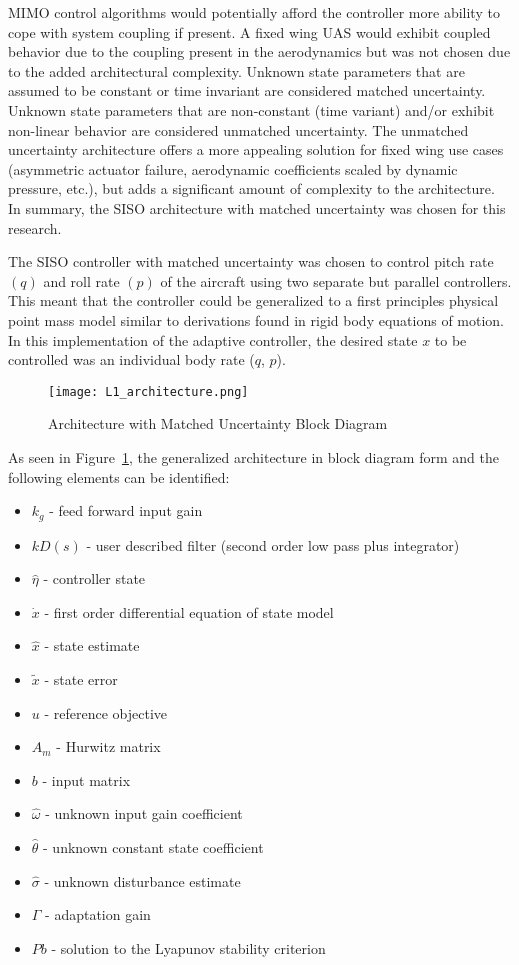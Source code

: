 \ac{MIMO} control algorithms would potentially afford the controller more ability to cope with system coupling if present.  A fixed wing \ac{UAS} would exhibit coupled behavior due to the coupling present in the aerodynamics but was not chosen due to the added architectural complexity.  Unknown state parameters that are assumed to be constant or time invariant are considered matched uncertainty.  Unknown state parameters that are non-constant (time variant) and/or exhibit non-linear behavior are considered unmatched uncertainty.  The unmatched uncertainty architecture offers a more appealing solution for fixed wing use cases (asymmetric actuator failure, aerodynamic coefficients scaled by dynamic pressure, etc.), but adds a significant amount of complexity to the architecture.  In summary, the \ac{SISO} architecture with matched uncertainty was chosen for this research.  

The \ac{SISO} controller with matched uncertainty was chosen to control pitch rate $(q)$ and roll rate $(p)$ of the aircraft using two separate but parallel controllers.  This meant that the controller could be generalized to a first principles physical point mass model similar to derivations found in rigid body equations of motion.  In this implementation of the \Lone adaptive controller, the desired state $x$ to be controlled was an individual body rate (\eg $q$, $p$). 

\begin{figure}[h!]
 \centering
  \texttt{[image: L1\_architecture.png]}
  \caption{\Lone Architecture with Matched Uncertainty Block Diagram \cite{hovakimyan2010l1} }
  \label{fig:l1_architecture}
\end{figure}

As seen in Figure~\ref{fig:l1_architecture}, the generalized \Lone architecture in block diagram form and the following elements can be identified:
\begin{itemize}
	\item[] $k_g$ - feed forward input gain
	\item[] $kD(s)$ - user described filter (second order low pass plus integrator)
	\item[] $\hat{\eta}$ - \Lone controller state
	\item[] $\dot{x}$ - first order differential equation of state model
	\item[] $\hat{x}$ - state estimate
	\item[] $\tilde{x}$ - state error
	\item[] $u$ - reference objective
	\item[] $A_m$ - Hurwitz matrix
	\item[] $b$ - input matrix
	\item[] $\hat{\omega}$ - unknown input gain coefficient
	\item[] $\hat{\theta}$ - unknown constant state coefficient
	\item[] $\hat{\sigma}$ - unknown disturbance estimate
	\item[] $\Gamma$ - adaptation gain
	\item[] $Pb$ - solution to the Lyapunov stability criterion	
\end{itemize}

